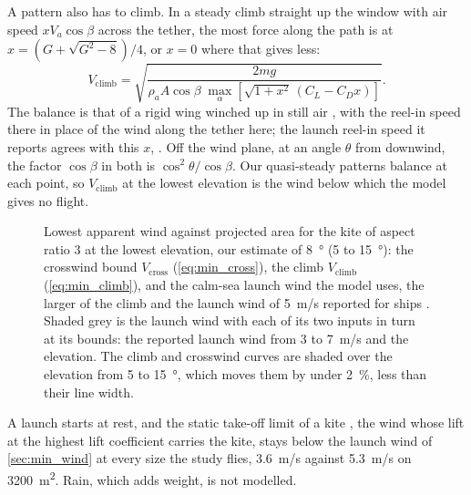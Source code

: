 A pattern also has to climb. In a steady climb straight up the window with air speed $xV_a\cos\beta$ across the tether, the most force along the path is at $x=(G+\sqrt{G^2-8})/4$, or $x=0$ where that gives less:
\begin{equation}
V_\mathrm{climb} = \sqrt{\frac{2mg}{\rho_a A\cos\beta\;\max_\alpha\left[\sqrt{1+x^2}\,(C_L-C_D x)\right]}}.
\label{eq:min_climb}
\end{equation}
The balance is that of a rigid wing winched up in still air \citep{fagiano2017takeoff}, with the reel-in speed there in place of the wind along the tether here; the launch reel-in speed it reports agrees with this $x$, . Off the wind plane, at an angle $\theta$ from downwind, the factor $\cos\beta$ in both is $\cos^2\theta/\cos\beta$. Our quasi-steady patterns balance at each point, so $V_\mathrm{climb}$ at the lowest elevation is the wind below which the model gives no flight.

\begin{figure}[tbp]
\centering
{}
\caption{Lowest apparent wind against projected area for the kite of aspect ratio 3 at the lowest elevation, our estimate of \SI{8}{\degree} (5 to \SI{15}{\degree}): the crosswind bound $V_\mathrm{cross}$ (\cref{eq:min_cross}), the climb $V_\mathrm{climb}$ (\cref{eq:min_climb}), and the calm-sea launch wind the model uses, the larger of the climb and the launch wind of \SI{5}{m/s} reported for ships \citep{paulig2013}. Shaded grey is the launch wind with each of its two inputs in turn at its bounds: the reported launch wind from 3 to \SI{7}{m/s} and the elevation. The climb and crosswind curves are shaded over the elevation from 5 to \SI{15}{\degree}, which moves them by under \SI{2}{\percent}, less than their line width.}
\label{fig:min_wind}
\end{figure}

A launch starts at rest, and the static take-off limit of a kite \citep{joshi2024powercurve,bigi2018}, the wind whose lift at the highest lift coefficient carries the kite, stays below the launch wind of \cref{sec:min_wind} at every size the study flies, \SI{3.6}{m/s} against \SI{5.3}{m/s} on \SI{3200}{m^2}. Rain, which adds weight, is not modelled.

